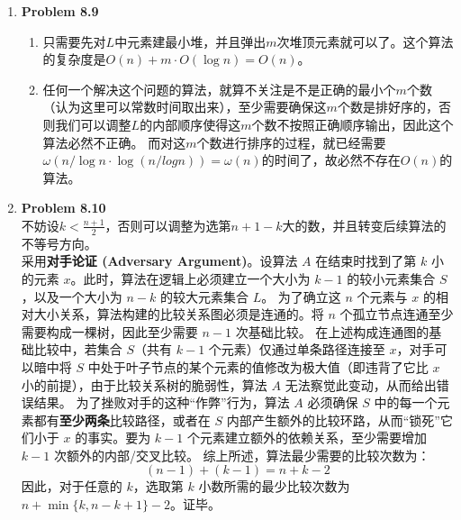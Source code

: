 \documentclass{ctexart}
\begin{document}
\begin{enumerate}[label=\arabic*.]
\begin{enumerate}[label=(\arabic*)]
        \end{enumerate}
    \item \textbf{Problem 8.9}
        \begin{enumerate}[label=(\arabic*)]
            \item 只需要先对$L$中元素建最小堆，并且弹出$m$次堆顶元素就可以了。这个算法的复杂度是$O(n)+m\cdot O(\log{n})=O(n)$。
            \item 任何一个解决这个问题的算法，就算不关注是不是正确的最小个$m$个数（认为这里可以常数时间取出来），至少需要确保这$m$个数是排好序的，否则我们可以调整$L$的内部顺序使得这$m$个数不按照正确顺序输出，因此这个算法必然不正确。
                而对这$m$个数进行排序的过程，就已经需要$\omega(n/\log{n}\cdot\log(n/log{n}))=\omega(n)$的时间了，故必然不存在$O(n)$的算法。
        \end{enumerate}
    \item \textbf{Problem 8.10}\\
        不妨设$k<\frac{n+1}{2}$，否则可以调整为选第$n+1-k$大的数，并且转变后续算法的不等号方向。\\
        采用\textbf{对手论证 (Adversary Argument)}。设算法 $A$ 在结束时找到了第 $k$ 小的元素 $x$。此时，算法在逻辑上必须建立一个大小为 $k-1$ 的较小元素集合 $S$，以及一个大小为 $n-k$ 的较大元素集合 $L$。
        为了确立这 $n$ 个元素与 $x$ 的相对大小关系，算法构建的比较关系图必须是连通的。将 $n$ 个孤立节点连通至少需要构成一棵树，因此至少需要 \textbf{$n-1$} 次基础比较。
        在上述构成连通图的基础比较中，若集合 $S$（共有 $k-1$ 个元素）仅通过单条路径连接至 $x$，对手可以暗中将 $S$ 中处于叶子节点的某个元素的值修改为极大值（即违背了它比 $x$ 小的前提），由于比较关系树的脆弱性，算法 $A$ 无法察觉此变动，从而给出错误结果。
        为了挫败对手的这种“作弊”行为，算法 $A$ 必须确保 $S$ 中的每一个元素都有\textbf{至少两条}比较路径，或者在 $S$ 内部产生额外的比较环路，从而“锁死”它们小于 $x$ 的事实。要为 $k-1$ 个元素建立额外的依赖关系，至少需要增加 \textbf{$k-1$} 次额外的内部/交叉比较。
        综上所述，算法最少需要的比较次数为：
        $$ (n-1) + (k-1) = n+k-2 $$
        因此，对于任意的 $k$，选取第 $k$ 小数所需的最少比较次数为 $n + \min\{k, n-k+1\} - 2$。证毕。
\end{enumerate}
\end{document}
